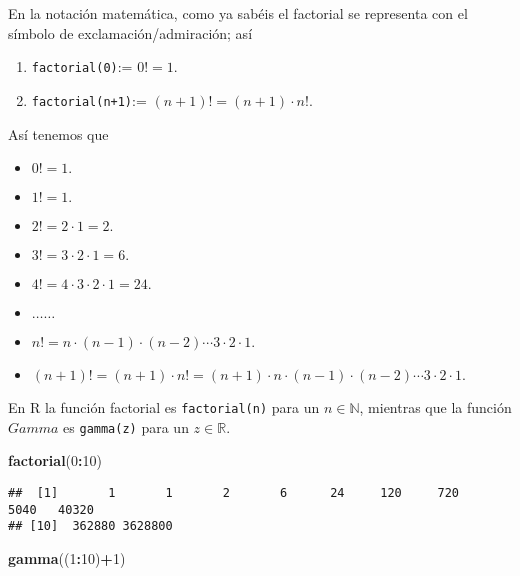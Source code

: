 \documentclass[
]{article}
\newenvironment{Shaded}{\begin{snugshade}}{\end{snugshade}}
\newcommand{\DecValTok}[1]{\textcolor[rgb]{0.00,0.00,0.81}{#1}}
\newcommand{\FunctionTok}[1]{\textcolor[rgb]{0.13,0.29,0.53}{\textbf{#1}}}
\newcommand{\NormalTok}[1]{#1}
\newcommand{\SpecialCharTok}[1]{\textcolor[rgb]{0.81,0.36,0.00}{\textbf{#1}}}
\providecommand{\tightlist}{%
  \setlength{\itemsep}{0pt}\setlength{\parskip}{0pt}}
\begin{document}
En la notación matemática, como ya sabéis el factorial se representa con
el símbolo de exclamación/admiración; así

\begin{enumerate}
\def\labelenumi{\arabic{enumi}.}
\tightlist
\item
  \texttt{factorial(0)}:= \(0!=1\).
\item
  \texttt{factorial(n+1)}:= \((n+1)!=(n+1)\cdot n!\).
\end{enumerate}

Así tenemos que

\begin{itemize}
\tightlist
\item
  \(0!=1.\)
\item
  \(1!=1.\)
\item
  \(2!= 2\cdot 1= 2.\)
\item
  \(3!=3\cdot 2\cdot 1= 6.\)
\item
  \(4!=4\cdot 3\cdot 2\cdot 1 =24.\)
\item
  \(\ldots \ldots\)
\item
  \(n!= n\cdot (n-1) \cdot (n-2) \cdots 3\cdot 2\cdot 1.\)
\item
  \((n+1)!= (n+1)\cdot n!= (n+1)\cdot n\cdot (n-1) \cdot (n-2) \cdots 3\cdot 2\cdot 1.\)
\end{itemize}

En R la función factorial es \texttt{factorial(n)} para un
\(n\in\mathbb{N}\), mientras que la función \(Gamma\) es
\texttt{gamma(z)} para un \(z\in\mathbb{R}\).

\begin{Shaded}
\begin{Highlighting}[]
\FunctionTok{factorial}\NormalTok{(}\DecValTok{0}\SpecialCharTok{:}\DecValTok{10}\NormalTok{)}
\end{Highlighting}
\end{Shaded}

\begin{verbatim}
##  [1]       1       1       2       6      24     120     720    5040   40320
## [10]  362880 3628800
\end{verbatim}

\begin{Shaded}
\begin{Highlighting}[]
\FunctionTok{gamma}\NormalTok{((}\DecValTok{1}\SpecialCharTok{:}\DecValTok{10}\NormalTok{)}\SpecialCharTok{+}\DecValTok{1}\NormalTok{)}
\end{Highlighting}
\end{Shaded}
\end{document}
